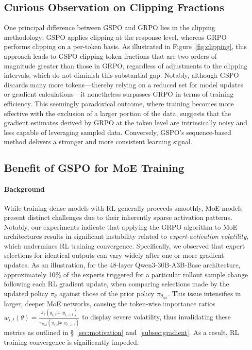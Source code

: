 \subsection{Curious Observation on Clipping Fractions}

One principal difference between GSPO and GRPO lies in the clipping methodology: GSPO applies clipping at the response level, whereas GRPO performs clipping on a per-token basis. As illustrated in Figure~\ref{fig:clipping}, this approach leads to GSPO clipping token fractions that are two orders of magnitude greater than those in GRPO, regardless of adjustments to the clipping intervals, which do not diminish this substantial gap. Notably, although GSPO discards many more tokens—thereby relying on a reduced set for model updates or gradient calculations—it nonetheless surpasses GRPO in terms of training efficiency. This seemingly paradoxical outcome, where training becomes more effective with the exclusion of a larger portion of the data, suggests that the gradient estimates derived by GRPO at the token level are intrinsically noisy and less capable of leveraging sampled data. Conversely, GSPO’s sequence-based method delivers a stronger and more consistent learning signal.

\subsection{Benefit of GSPO for MoE Training}
\label{subsec:routing_replay}

\paragraph{Background}
While training dense models with RL generally proceeds smoothly, MoE models present distinct challenges due to their inherently sparse activation patterns. Notably, our experiments indicate that applying the GRPO algorithm to MoE architectures results in significant instability related to \textit{expert-activation volatility}, which undermines RL training convergence. Specifically, we observed that expert selections for identical outputs can vary widely after one or more gradient updates. As an illustration, for the 48-layer Qwen3-30B-A3B-Base architecture, approximately 10\% of the experts triggered for a particular rollout sample change following each RL gradient update, when comparing selections made by the updated policy $\pi_{\theta}$ against those of the prior policy $\pi_{\theta_\text{old}}$. This issue intensifies in larger, deeper MoE networks, causing the token-wise importance ratios $w_{i,t}(\theta) = \frac{ \pi_{\theta} (y_{i,t} | x, y_{i,<t}) }{ \pi_{\theta_\text{old}} (y_{i,t} | x,y_{i,<t})}$ to display severe volatility, thus invalidating these metrics as outlined in \S~\ref{sec:motivation} and~\ref{subsec:gradient}. As a result, RL training convergence is significantly impeded.

